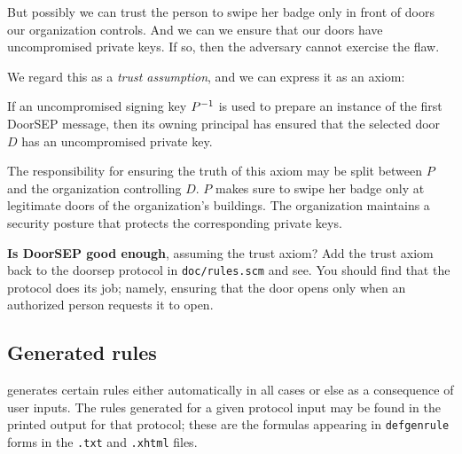 But possibly we can trust the person to swipe her badge only in front
of doors our organization controls.  And we can we ensure that our
doors have uncompromised private keys.  If so, then the adversary
cannot exercise the flaw.

We regard this as a \emph{trust assumption}, and we can express it as
an axiom:
%
\begin{axiom}\label{axiom:trust assumption}
  If an uncompromised signing key ${{P}^{-1}}$ is used to prepare an
  instance of the first DoorSEP message, then its owning principal has
  ensured that the selected door $D$ has an uncompromised private key.
\end{axiom}
%
The responsibility for ensuring the truth of this axiom may be split
between $P$ and the organization controlling $D$.  $P$ makes sure to
swipe her badge only at legitimate doors of the organization's
buildings.  The organization maintains a security posture that
protects the corresponding private keys.

\medskip\noindent\textbf{Is DoorSEP good enough}, assuming the trust
axiom?  Add the trust axiom back to the doorsep protocol in
\texttt{doc/rules.scm} and see.  You should find that the protocol
does its job; namely, ensuring that the door opens only when an
authorized person requests it to open.

\subsection{Generated rules}
\label{sec:goals:rules:gen}

{\cpsa} generates certain rules either automatically in all cases or
else as a consequence of user inputs.  The rules generated for a given
protocol input may be found in the printed output for that protocol;
these are the formulas appearing in \texttt{defgenrule} forms in the
\texttt{.txt} and \texttt{.xhtml} files.

